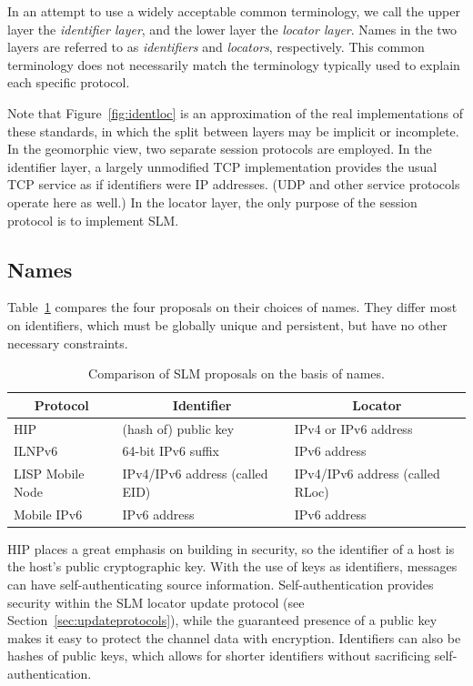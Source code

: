 In an attempt to use a widely acceptable common terminology,
we call the upper layer 
the {\it identifier layer}, and the lower layer
the {\it locator layer}.
Names in the two layers are referred to as {\it identifiers} and
{\it locators}, respectively.
This common terminology does not necessarily match the terminology
typically used to explain each specific protocol.

Note that
Figure~\ref{fig:identloc} is an approximation of the real
implementations of these standards, in which the split between layers may
be implicit or incomplete.
In the geomorphic view, two separate session protocols are employed.
In the identifier layer, a largely unmodified TCP implementation provides
the usual TCP service as if identifiers were IP addresses.
(UDP and other service protocols operate here 
as well.)
In the locator layer, the only purpose of the session protocol is
to implement SLM.

\subsection{Names}

Table~\ref{tab:slm} compares the four proposals on their choices of
names.
They differ most on identifiers, which must be globally unique and
persistent, but have no other necessary constraints.

\begin{table}
\begin{center}
\footnotesize
\begin{tabular}{|l|l|l|} \hline
\multicolumn{1}{|c|}{\bf Protocol} & 
  \multicolumn{1}{c|}{\bf Identifier} & 
  \multicolumn{1}{c|}{\bf Locator} \\ \hline
HIP & (hash of) public key & IPv4 or IPv6 address \\ \hline
ILNPv6 & 64-bit IPv6 suffix & IPv6 address \\ \hline
LISP Mobile Node & IPv4/IPv6 address (called EID) & IPv4/IPv6 address (called RLoc) \\ \hline
Mobile IPv6 & IPv6 address & IPv6 address \\ \hline
\end{tabular}
\end{center}
\caption{Comparison of SLM proposals on the basis of names.}
\label{tab:slm}
\end{table}

HIP places a great emphasis on building in security, so the identifier
of a host is the host's
public cryptographic key.
With the use of keys as identifiers, 
messages can have self-authenticating source information.
Self-authentication provides security within the SLM locator
update protocol (see Section~\ref{sec:updateprotocols}), while
the guaranteed presence of a public key makes it easy to protect
the channel data with encryption.
Identifiers can also be hashes of public keys, which allows for shorter
identifiers without sacrificing self-authentication.

